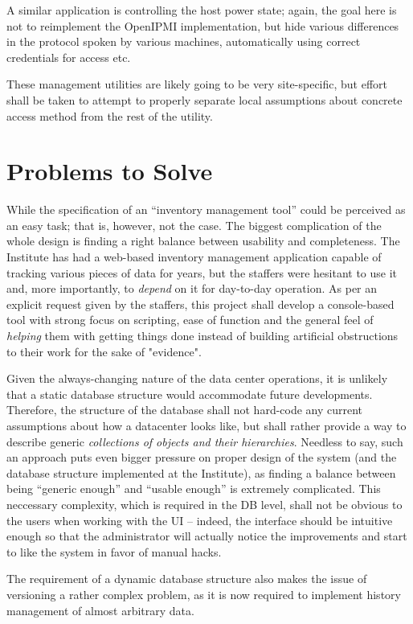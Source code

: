 \documentclass{article}
\begin{document}
A similar application is controlling the host power state; again, the goal here is not to reimplement the OpenIPMI implementation,
but hide various differences in the protocol spoken by various machines, automatically using correct credentials for access etc.

These management utilities are likely going to be very site-specific, but effort shall be taken to attempt to properly separate
local assumptions about concrete access method from the rest of the utility.

\section{Problems to Solve}

While the specification of an ``inventory management tool'' could be perceived as an easy task; that is, however, not
the case.  The biggest complication of the whole design is finding a right balance between usability and completeness.  The
Institute has had a web-based inventory management application capable of tracking various pieces of data for years, but the
staffers were hesitant to use it and, more importantly, to {\em depend} on it for day-to-day operation.  As per an explicit request given
by the staffers, this project shall develop a console-based tool with strong focus on scripting, ease of function and the general
feel of {\em helping} them with getting things done instead of building artificial obstructions to their work for the sake of "evidence".

Given the always-changing nature of the data center operations, it is unlikely that a static database structure would accommodate
future developments.  Therefore, the structure of the database shall not hard-code any current assumptions about how a datacenter looks
like, but shall rather provide a way to describe generic {\em collections of objects and their hierarchies}.  Needless to say,
such an approach puts even bigger pressure on proper design of the system (and the database structure implemented at the Institute), as
finding a balance between being ``generic enough'' and ``usable enough'' is extremely complicated.  This neccessary complexity, which
is required in the DB level, shall not be obvious to the users when working with the UI -- indeed, the interface should be
intuitive enough so that the administrator will actually notice the improvements and start to like the system in favor of
manual hacks. 

The requirement of a dynamic database structure also makes the issue of versioning a rather complex problem, as it is now required
to implement history management of almost arbitrary data. 
\end{document}
